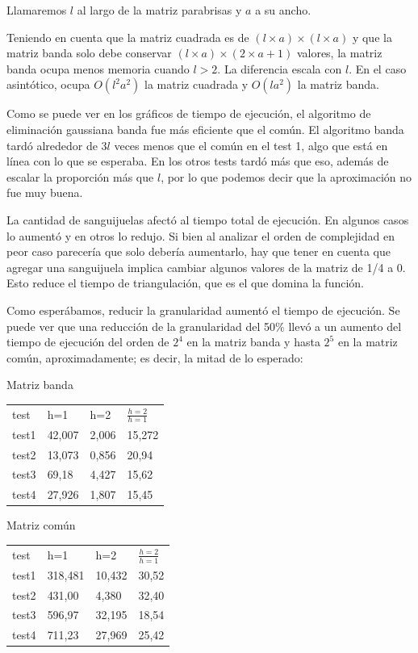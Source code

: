 \documentclass[spanish,a4paper]{article}
\begin{document}
Llamaremos $l$ al largo de la matriz parabrisas y $a$ a su ancho. 

Teniendo en cuenta que la matriz cuadrada es de $(l \times a) \times (l \times a)$ y que la matriz banda solo debe conservar $(l \times a) \times (2 \times a + 1)$ valores, la matriz banda ocupa menos memoria cuando $l > 2$. La diferencia escala con $l$. En el caso asintótico, ocupa $O(l^2 a^2)$ la matriz cuadrada y $O(l a^2)$ la matriz banda.

Como se puede ver en los gráficos de tiempo de ejecución, el algoritmo de eliminación gaussiana banda fue más eficiente que el común. El algoritmo banda tardó alrededor de $3l$ veces menos que el común en el test 1, algo que está en línea con lo que se esperaba. En los otros tests tardó más que eso, además de escalar la proporción más que $l$, por lo que podemos decir que la aproximación no fue muy buena.

La cantidad de sanguijuelas afectó al tiempo total de ejecución. En algunos casos lo aumentó y en otros lo redujo. Si bien al analizar el orden de complejidad en peor caso parecería que solo debería aumentarlo, hay que tener en cuenta que agregar una sanguijuela implica cambiar algunos valores de la matriz de 1/4 a 0. Esto reduce el tiempo de triangulación, que es el que domina la función.

Como esperábamos, reducir la granularidad aumentó el tiempo de ejecución. Se puede ver que una reducción de la granularidad del 50$\%$ llevó a un aumento del tiempo de ejecución del orden de $2^4$ en la matriz banda y hasta $2^5$ en la matriz común, aproximadamente; es decir, la mitad de lo esperado:\newline


Matriz banda\newline
\begin{tabular}{ l l l l}
  test & h=1 & h=2 & $\frac{h=2}{h=1}$ \\
  test1 & 42,007 & 2,006 & 15,272 \\
  test2 & 13,073 & 0,856 & 20,94 \\
  test3 & 69,18 & 4,427 & 15,62 \\
  test4 & 27,926 & 1,807 & 15,45 \\
\end{tabular} \newline \newline
Matriz común \newline 
\begin{tabular}{ l l l l}
  test & h=1 & h=2 & $\frac{h=2}{h=1}$ \\
  test1 & 318,481 & 10,432 & 30,52 \\
  test2 & 431,00 & 4,380 & 32,40 \\
  test3 & 596,97 & 32,195 & 18,54 \\
  test4 & 711,23 & 27,969 & 25,42 \\
\end{tabular} \newline \newline
\end{document}
